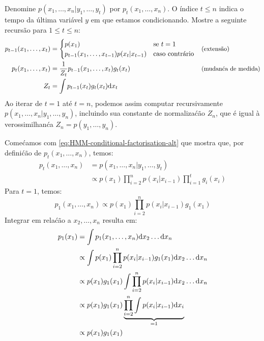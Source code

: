 \begin{exenumerate}
    \item Denomine $ p(x_1, \ldots, x_n|y_1, \ldots, y_t)$ por $p_t(x_1,
    \ldots, x_n)$. O \'indice $t \le n$ indica o tempo da
    \'ultima vari\'avel $y$ em que estamos condicionando. Mostre a seguinte
    recurs\~ao para $1 \le t \le n$:
    \begin{align}
        p_{t-1}(x_1, \ldots, x_t) &=
        \begin{cases}
            p(x_1) & \text{se } t=1\\
            p_{t-1}(x_1, \ldots, x_{t-1}) p(x_t|x_{t-1}) & \text{caso contr\'ario}
            \label{eq:HMM-extension-alt}
        \end{cases} && \text{\small (extens\~ao)}\\
        p_{t}(x_1, \ldots, x_{t}) &= \frac{1}{Z_t} p_{t-1}(x_1, \ldots, x_t) g_t(x_t) \label{eq:HMM-change-of-measure-alt} && \text{\small (mudan\'ca de medida)}\\
        Z_t & = \int p_{t-1}(x_t) g_t(x_t) \ud x_t 
    \end{align}
    Ao iterar de $t=1$ at\'e $t=n$, podemos assim computar recursivamente
    $p(x_1, \ldots, x_n|y_1, \ldots, y_n)$, incluindo sua constante de
    normaliza\'c\~ao $Z_n$, que \'e igual \`a verossimilhan\'ca $ Z_n = p(y_1, \ldots, y_n)$. 
    
    \begin{solution}
        Come\'camos com \eqref{eq:HMM-conditional-factorisation-alt} que mostra
        que, por defini\'c\~ao de $p_t(x_1, \ldots, x_n)$, temos:
        \begin{align}
            p_t(x_1, \ldots, x_n) & = p(x_1, \ldots, x_n | y_1, \ldots, y_t)\\
            &\propto p(x_1) \prod_{i=2}^n p(x_i|x_{i-1}) \prod_{i=1}^t g_i(x_i)
            \label{eq:HMM-conditional-factorisation-2-alt} 
        \end{align}
        Para $t=1$, temos:
        \begin{equation}
            p_1(x_1, \ldots, x_n) \propto  p(x_1) \prod_{i=2}^n p(x_i|x_{i-1}) g_1(x_1)
        \end{equation}
        Integrar em rela\'c\~ao a $x_2, \ldots, x_n$ resulta em:
        \begin{align}
            p_1(x_1) & = \int p_1(x_1, \ldots, x_n) \mathrm{d} x_2 \ldots \mathrm{d} x_n\\
            &\propto \int  p(x_1) \prod_{i=2}^n p(x_i|x_{i-1}) g_1(x_1)\mathrm{d} x_2 \ldots \mathrm{d} x_n\\
            &\propto p(x_1) g_1(x_1) \int  \prod_{i=2}^n p(x_i|x_{i-1})\mathrm{d} x_2 \ldots \mathrm{d} x_n\\
            &\propto p(x_1) g_1(x_1) \underbrace{\prod_{i=2}^n \int p(x_i|x_{i-1})\mathrm{d} x_i}_{=1}\\
            &\propto p(x_1) g_1(x_1)
        \end{align}
        

\end{solution}
\end{exenumerate}
